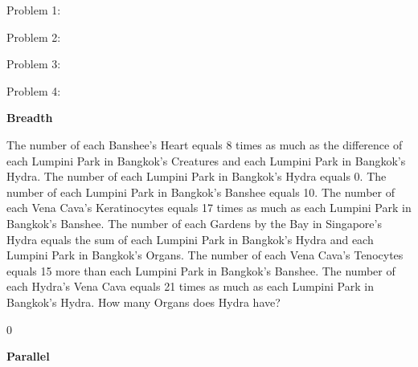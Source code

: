 \begin{userprompt}[title={Answer}]
Problem 1: 

Problem 2: 

Problem 3: 

Problem 4: 
\end{userprompt}



\textbf{Breadth}


\begin{systemprompt}[title={Question}]
 The number of each Banshee's Heart equals 8 times as much as the difference of each Lumpini Park in Bangkok's Creatures and each Lumpini Park in Bangkok's Hydra. The number of each Lumpini Park in Bangkok's Hydra equals 0. The number of each Lumpini Park in Bangkok's Banshee equals 10. The number of each Vena Cava's Keratinocytes equals 17 times as much as each Lumpini Park in Bangkok's Banshee. The number of each Gardens by the Bay in Singapore's Hydra equals the sum of each Lumpini Park in Bangkok's Hydra and each Lumpini Park in Bangkok's Organs. The number of each Vena Cava's Tenocytes equals 15 more than each Lumpini Park in Bangkok's Banshee. The number of each Hydra's Vena Cava equals 21 times as much as each Lumpini Park in Bangkok's Hydra. How many Organs does Hydra have?
 \end{systemprompt}
\begin{userprompt}[title={Answer}]
0
\end{userprompt}


\textbf{Parallel}


